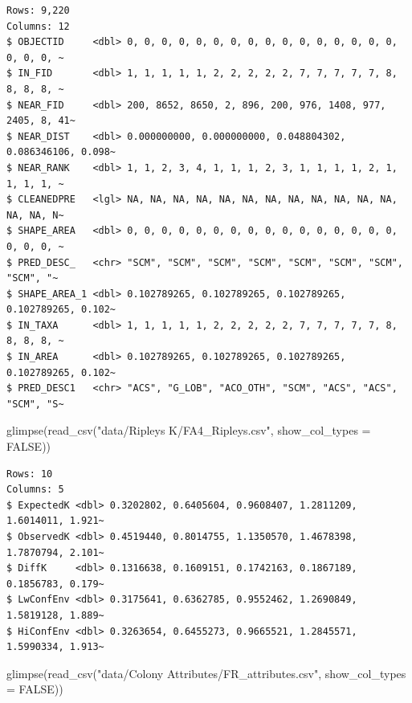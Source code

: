 \documentclass[
  letterpaper,
  DIV=11,
  numbers=noendperiod]{scrartcl}
\newenvironment{Shaded}{\begin{snugshade}}{\end{snugshade}}
\newcommand{\AttributeTok}[1]{\textcolor[rgb]{0.40,0.45,0.13}{#1}}
\newcommand{\ConstantTok}[1]{\textcolor[rgb]{0.56,0.35,0.01}{#1}}
\newcommand{\FunctionTok}[1]{\textcolor[rgb]{0.28,0.35,0.67}{#1}}
\newcommand{\NormalTok}[1]{\textcolor[rgb]{0.00,0.23,0.31}{#1}}
\newcommand{\StringTok}[1]{\textcolor[rgb]{0.13,0.47,0.30}{#1}}
\begin{document}
\begin{verbatim}
Rows: 9,220
Columns: 12
$ OBJECTID     <dbl> 0, 0, 0, 0, 0, 0, 0, 0, 0, 0, 0, 0, 0, 0, 0, 0, 0, 0, 0, ~
$ IN_FID       <dbl> 1, 1, 1, 1, 1, 2, 2, 2, 2, 2, 7, 7, 7, 7, 7, 8, 8, 8, 8, ~
$ NEAR_FID     <dbl> 200, 8652, 8650, 2, 896, 200, 976, 1408, 977, 2405, 8, 41~
$ NEAR_DIST    <dbl> 0.000000000, 0.000000000, 0.048804302, 0.086346106, 0.098~
$ NEAR_RANK    <dbl> 1, 1, 2, 3, 4, 1, 1, 1, 2, 3, 1, 1, 1, 1, 2, 1, 1, 1, 1, ~
$ CLEANEDPRE   <lgl> NA, NA, NA, NA, NA, NA, NA, NA, NA, NA, NA, NA, NA, NA, N~
$ SHAPE_AREA   <dbl> 0, 0, 0, 0, 0, 0, 0, 0, 0, 0, 0, 0, 0, 0, 0, 0, 0, 0, 0, ~
$ PRED_DESC_   <chr> "SCM", "SCM", "SCM", "SCM", "SCM", "SCM", "SCM", "SCM", "~
$ SHAPE_AREA_1 <dbl> 0.102789265, 0.102789265, 0.102789265, 0.102789265, 0.102~
$ IN_TAXA      <dbl> 1, 1, 1, 1, 1, 2, 2, 2, 2, 2, 7, 7, 7, 7, 7, 8, 8, 8, 8, ~
$ IN_AREA      <dbl> 0.102789265, 0.102789265, 0.102789265, 0.102789265, 0.102~
$ PRED_DESC1   <chr> "ACS", "G_LOB", "ACO_OTH", "SCM", "ACS", "ACS", "SCM", "S~
\end{verbatim}

\begin{Shaded}
\begin{Highlighting}[]
\FunctionTok{glimpse}\NormalTok{(}\FunctionTok{read\_csv}\NormalTok{(}\StringTok{"data/Ripleys K/FA4\_Ripley\textquotesingle{}s.csv"}\NormalTok{, }\AttributeTok{show\_col\_types =} \ConstantTok{FALSE}\NormalTok{))}
\end{Highlighting}
\end{Shaded}

\begin{verbatim}
Rows: 10
Columns: 5
$ ExpectedK <dbl> 0.3202802, 0.6405604, 0.9608407, 1.2811209, 1.6014011, 1.921~
$ ObservedK <dbl> 0.4519440, 0.8014755, 1.1350570, 1.4678398, 1.7870794, 2.101~
$ DiffK     <dbl> 0.1316638, 0.1609151, 0.1742163, 0.1867189, 0.1856783, 0.179~
$ LwConfEnv <dbl> 0.3175641, 0.6362785, 0.9552462, 1.2690849, 1.5819128, 1.889~
$ HiConfEnv <dbl> 0.3263654, 0.6455273, 0.9665521, 1.2845571, 1.5990334, 1.913~
\end{verbatim}

\begin{Shaded}
\begin{Highlighting}[]
\FunctionTok{glimpse}\NormalTok{(}\FunctionTok{read\_csv}\NormalTok{(}\StringTok{"data/Colony Attributes/FR\_attributes.csv"}\NormalTok{, }\AttributeTok{show\_col\_types =} \ConstantTok{FALSE}\NormalTok{))}
\end{Highlighting}
\end{Shaded}
\end{document}
